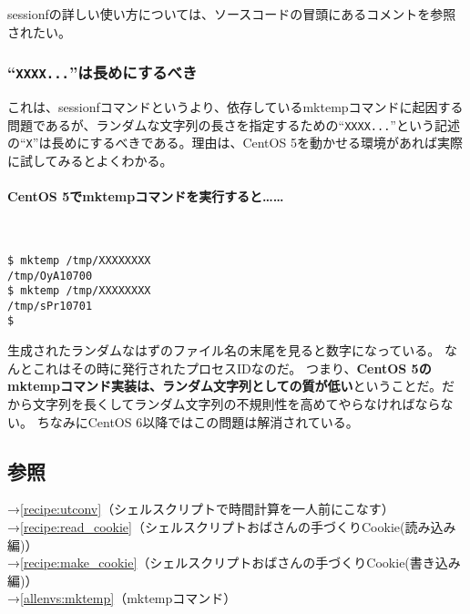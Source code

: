 sessionfの詳しい使い方については、ソースコードの冒頭にあるコメントを参照されたい。

\subsubsection*{``\verb|XXXX...|''は長めにするべき}

これは、sessionfコマンドというより、依存しているmktempコマンドに起因する問題であるが、ランダムな文字列の長さを指定するための``\verb|XXXX...|''という記述の``\verb|X|''は長めにするべきである。理由は、CentOS 5を動かせる環境があれば実際に試してみるとよくわかる。

\paragraph{CentOS 5でmktempコマンドを実行すると……} 　\\
\begin{screen}
	\verb|$ mktemp /tmp/XXXXXXXX| \return \\
	\verb|/tmp/OyA10700|                  \\
	\verb|$ mktemp /tmp/XXXXXXXX| \return \\
	\verb|/tmp/sPr10701|                  \\
	\verb|$ |
\end{screen}

生成されたランダムなはずのファイル名の末尾を見ると数字になっている。
なんとこれはその時に発行されたプロセスIDなのだ。
つまり、\textbf{CentOS 5のmktempコマンド実装は、ランダム文字列としての質が低い}ということだ。だから文字列を長くしてランダム文字列の不規則性を高めてやらなければならない。
ちなみにCentOS 6以降ではこの問題は解消されている。

\subsection*{参照}

\noindent
→\ref{recipe:utconv}（シェルスクリプトで時間計算を一人前にこなす）\\
→\ref{recipe:read_cookie}（シェルスクリプトおばさんの手づくりCookie(読み込み編)）\\
→\ref{recipe:make_cookie}（シェルスクリプトおばさんの手づくりCookie(書き込み編)）\\
→\ref{allenvs:mktemp}（mktempコマンド）

